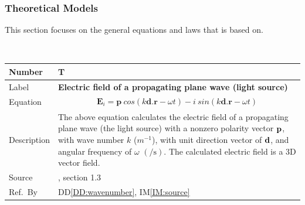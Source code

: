\documentclass[12pt]{article}
\newcommand{\colBwidth}{0.82\textwidth} \newcommand{\colCwidth}{0.1\textwidth}
\begin{document}
	\subsubsection{Theoretical Models}\label{sec_theoretical}
	
	This section focuses on the general equations and laws that \progname{} is based
	on. %
	
	~\newline \noindent \begin{minipage}{\textwidth}
		\renewcommand*{\arraystretch}{1.5} \begin{tabular}{| p{\colAwidth} |
				p{\colBwidth}|} \hline \rowcolor[gray]{0.9} Number&
			T{theorynum}\thetheorynum \label{TM:source}\\ \hline Label&\bf
			Electric field of a propagating plane wave (light source) \\ \hline Equation&
			\begin{equation} \label{eq:planewave} \begin{gathered} \textbf{E}_{i}=
					\textbf{p} \ cos(k\textbf{d.r}-\omega t)- i \ sin(k\textbf{d.r}-\omega t) \end{gathered} 
			\end{equation} \\
			
			
			\hline Description & The above equation calculates the electric field of a
			propagating plane wave (the light source) with a nonzero polarity vector $\bf
			p$, with wave number $k$ ($m^{-1}$), with unit direction vector of $\bf d$,
			and angular frequency of $\omega$ $(\si{\per \second})$. The calculated
			electric field is a 3D vector field. \\ \hline Source &
			
			\cite{monk2003finite}, section 1.3 \\ %
			\hline Ref.\ By & DD\ref{DD:wavenumber}, IM\ref{IM:source} \\ \hline
	\end{tabular} \end{minipage}\\
	
	
\end{document}
